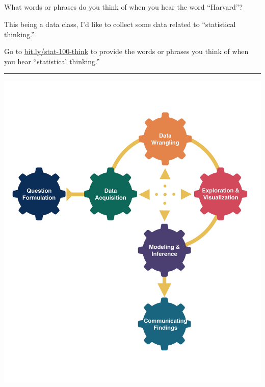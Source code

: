 \documentclass[
  letterpaper,
  DIV=11,
  numbers=noendperiod]{scrartcl}
\author{}
\date{}
\begin{document}
\ifdefined\Shaded\renewenvironment{Shaded}{\begin{tcolorbox}[sharp corners, frame hidden, interior hidden, enhanced, boxrule=0pt, breakable, borderline west={3pt}{0pt}{shadecolor}]}{\end{tcolorbox}}\fi

\hypertarget{keyword}{%
\subsection{}\label{keyword}}

What words or phrases do you think of when you hear the word
{``Harvard''}?

This being a {data} class, I'd like to collect some data related to
{``statistical thinking.''}

Go to \href{https://bit.ly/stat-100-think}{bit.ly/stat-100-think} to
provide the words or phrases you think of when you hear {``statistical
thinking.''}

\begin{center}\rule{0.5\linewidth}{0.5pt}\end{center}

\includegraphics[width=1\textwidth,height=\textheight]{img/DAW.png}
\end{document}
